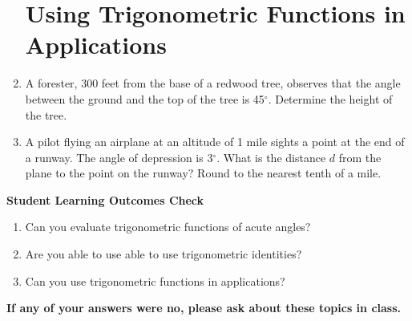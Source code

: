 \documentclass[11pt]{article}
\begin{document}
\begin{enumerate}
\newpage
\section{Using Trigonometric Functions in Applications}
\item A forester, 300 feet from the base of a redwood tree, observes that the angle between the ground and the top of the tree is 45$^\circ$.  Determine the height of the tree.

\vfill
\item A pilot flying an airplane at an altitude of 1 mile sights a point at the end of a runway.  The angle of depression is 3$^\circ$.  What is the distance $d$ from the plane to the point on the runway?  Round to the nearest tenth of a mile.
\vfill
\vfill
\end{enumerate}

\noindent \textbf{Student Learning Outcomes Check}

\begin{enumerate}
\item Can you evaluate trigonometric functions of acute angles?
\item Are you able to use able to use trigonometric identities?
\item Can you use trigonometric functions in applications?
\end{enumerate}

\noindent \textbf{If any of your answers were no, please ask about these topics in class.}
\end{document}
